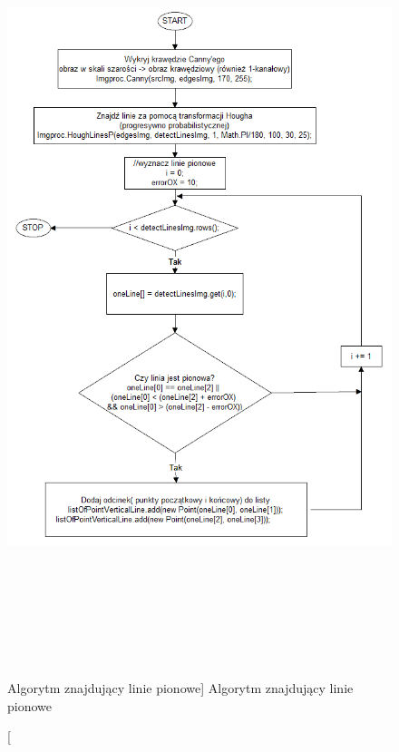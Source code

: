 \documentclass[a4paper,12pt]{article}
\begin{document}
    	        \begin{figure}[!ht]  
    			    \begin{center}
    				    \includegraphics[height=22.5cm]{image//algorithm//divideToPagePred_01.png} 
    			    \end{center}
    			    \caption
        			    [Algorytm znajdujący linie pionowe]  
        			    {Algorytm znajdujący linie pionowe}  
    		    \end{figure}
		
\end{document}
